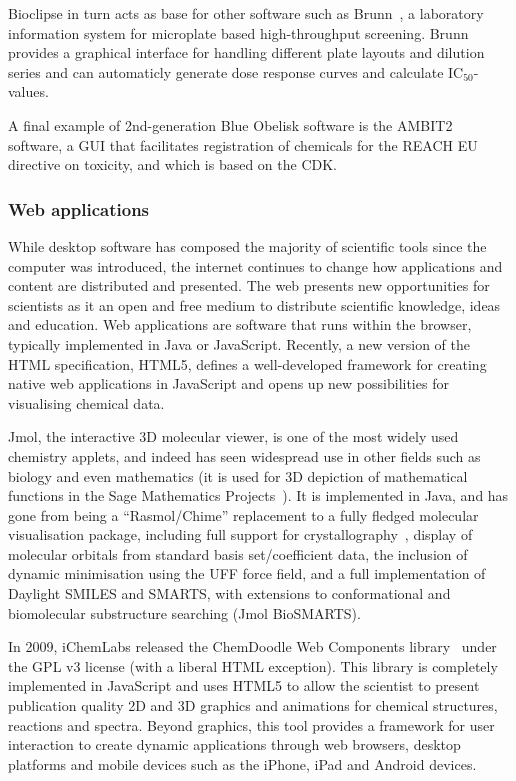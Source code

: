 \documentclass[10pt]{bmc_article}
\newenvironment{bmcformat}{\fussy\setboolean{publ}{true}}{\fussy}
\begin{document}
\begin{bmcformat}
Bioclipse in turn acts as base for other software
such as Brunn~\cite{Alvarsson:2011fk}, a laboratory information system for
microplate based high-throughput screening. Brunn provides a graphical interface
for handling different plate layouts and dilution series and can automaticly
generate dose response curves and calculate IC$_{50}$-values.

A final example of 2nd-generation Blue Obelisk software is the 
AMBIT2~\cite{WebAMBIT} software, a GUI that facilitates registration
of chemicals for the REACH EU directive on toxicity, and which is
based on the CDK.

\subsubsection*{Web applications}

While desktop software has composed the majority of scientific tools
since the computer was introduced, the internet continues to change
how applications and content are distributed and presented. The web
presents new opportunities for scientists as it
an open and free medium to distribute scientific knowledge, ideas and
education. Web applications are software that runs within the browser,
typically implemented in Java or JavaScript.
Recently, a new version of the HTML
specification, HTML5, defines a well-developed framework
for creating native web applications in JavaScript and opens up
new possibilities for visualising chemical data.

Jmol, the interactive 3D molecular viewer, is one of the most widely used
chemistry applets, and indeed has
seen widespread use in other fields such as biology and 
even mathematics (it is used for 3D depiction of mathematical
functions in the Sage Mathematics Projects~\cite{WebSage}). It is implemented
in Java, and has gone from being a ``Rasmol/Chime'' replacement to a fully fledged molecular
visualisation package, including full support for crystallography~\cite{Hanson2010},
display of molecular orbitals from standard basis set/coefficient data,
the inclusion of dynamic minimisation using the UFF force field, and
a full implementation of Daylight SMILES and SMARTS, with extensions to
conformational and biomolecular substructure searching (Jmol
BioSMARTS).

In 2009, iChemLabs released the ChemDoodle Web Components
library~\cite{ChemDoodleWeb} under the GPL v3 license (with a
liberal HTML exception). This library is completely implemented in JavaScript
and uses HTML5 to allow the scientist
to present publication quality 2D and 3D graphics and animations for
chemical structures, reactions and spectra. Beyond graphics, this tool
provides a framework for user interaction to create dynamic
applications through web browsers, desktop platforms and mobile
devices such as the iPhone, iPad and Android devices.


\end{bmcformat}
\end{document}
